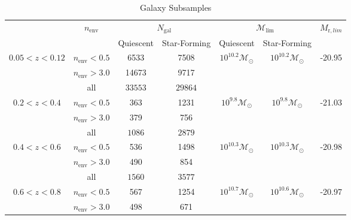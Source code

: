 \documentclass{aastex}
\def \lowenvthresh {0.5}
\def \highenvthresh {3.0}
\begin{document}
\begin{table*} 
  \caption{Galaxy Subsamples}
  \label{tab:subsample}
  \begin{center}
    \leavevmode
    \begin{tabular}{ccccccc} \hline \hline              
     &\multicolumn{1}{c}{$n_{\mathrm{env}}$}        & \multicolumn{2}{c}{$N_{\mathrm{gal}}$}  & \multicolumn{2}{c}{$\mathcal{M}_{\mathrm{lim}}$} & $M_{\mathrm{r}, lim}$ \\ 
    & & Quiescent & Star-Forming & Quiescent & Star-Forming &  \\ \hline 
$0.05 < z < 0.12$ & $n_{\mathrm{env}} < \lowenvthresh $ & 6533 & 7508 & $10^{10.2} \mathcal{M}_{\odot}$ & $10^{10.2} \mathcal{M}_{\odot}$ & -20.95 \\
               & $n_{\mathrm{env}} > \highenvthresh $ &14673 & 9717 &                          \\ 
                              & all          &$33553$                       & $29864$                          \\ \hline
$0.2 < z < 0.4$      &$n_{\mathrm{env}} < \lowenvthresh $           &363                    &1231 & $10^{9.8} \mathcal{M}_{\odot}$ & $10^{9.8} \mathcal{M}_{\odot}$ &-21.03 \\
               &$n_{\mathrm{env}} > \highenvthresh $            &379                    &756                           \\
               & all                & $1086$                      & $2879$                          \\ \hline
$0.4 < z < 0.6$      &$n_{\mathrm{env}} < \lowenvthresh $           &536                       &1498 & $10^{10.3} \mathcal{M}_{\odot}$ & $10^{10.3} \mathcal{M}_{\odot}$ & -20.98 \\
               &$n_{\mathrm{env}} > \highenvthresh $            &490                       &854                           \\
               & all               & $1560$                      & $3577$                          \\ \hline
$0.6 < z < 0.8$      &$n_{\mathrm{env}} < \lowenvthresh $           &567                       &1254  & $10^{10.7} \mathcal{M}_{\odot}$ & $10^{10.6} \mathcal{M}_{\odot}$ & -20.97 \\
               &$n_{\mathrm{env}} > \highenvthresh $            &498                       &671                           \\

\end{tabular}
\end{center}
\end{table*}
\end{document}

